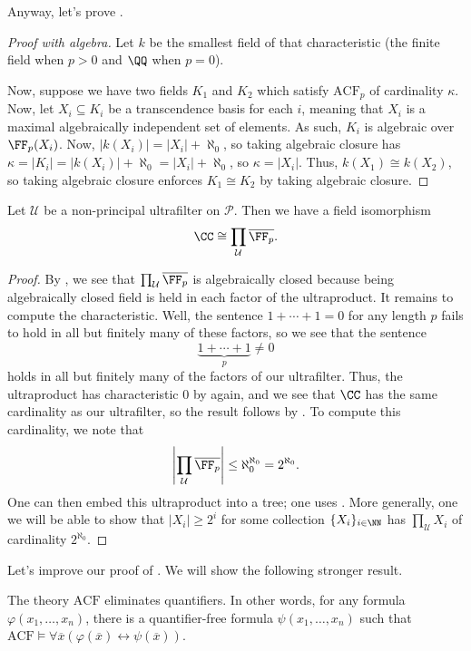 \documentclass[../notes.tex]{subfiles}
\begin{document}
Anyway, let's prove .
\begin{proof}[Proof with algebra]
	Let $k$ be the smallest field of that characteristic (the finite field when $p>0$ and $\QQ$ when $p=0$).
	
	Now, suppose we have two fields $K_1$ and $K_2$ which satisfy $\mathrm{ACF}_p$ of cardinality $\kappa$. Now, let $X_i\subseteq K_i$ be a transcendence basis for each $i$, meaning that $X_i$ is a maximal algebraically independent set of elements. As such, $K_i$ is algebraic over $\FF_p(X_i)$. Now, $\left|k(X_i)\right|=\left|X_i\right|+\aleph_0$, so taking algebraic closure has $\kappa=\left|K_i\right|=\left|k(X_i)\right|+\aleph_0=\left|X_i\right|+\aleph_0$, so $\kappa=\left|X_i\right|$. Thus, $k(X_1)\cong k(X_2)$, so taking algebraic closure enforces $K_1\cong K_2$ by taking algebraic closure.
\end{proof}
\begin{corollary}
	Let $\mathcal U$ be a non-principal ultrafilter on $\mathcal P$. Then we have a field isomorphism
	\[\CC\cong\prod_{\mathcal U}\overline{\FF_p}.\]
\end{corollary}
\begin{proof}
	By , we see that $\prod_{\mathcal U}\overline{\FF_p}$ is algebraically closed because being algebraically closed field is held in each factor of the ultraproduct. It remains to compute the characteristic. Well, the sentence $1+\cdots+1=0$ for any length $p$ fails to hold in all but finitely many of these factors, so we see that the sentence
	\[\underbrace{1+\cdots+1}_p\ne 0\]
	holds in all but finitely many of the factors of our ultrafilter. Thus, the ultraproduct has characteristic $0$ by  again, and we see that $\CC$ has the same cardinality as our ultrafilter, so the result follows by . To compute this cardinality, we note that
	\[\left|\prod_\mathcal U\overline{\FF_p}\right|\le\aleph_0^{\aleph_0}=2^{\aleph_0}.\]
	One can then embed this ultraproduct into a tree; one uses . More generally, one we will be able to show that $\left|X_i\right|\ge2^i$ for some collection $\{X_i\}_{i\in\NN}$ has $\prod_\mathcal UX_i$ of cardinality $2^{\aleph_0}$.
\end{proof}
Let's improve our proof of . We will show the following stronger result.
\begin{theorem}
	The theory $\mathrm{ACF}$ eliminates quantifiers. In other words, for any formula $\varphi(x_1,\ldots,x_n)$, there is a quantifier-free formula $\psi(x_1,\ldots,x_n)$ such that $\mathrm{ACF}\models\forall\overline x(\varphi(\overline x)\leftrightarrow\psi(\overline x))$.
\end{theorem}
\end{document}
